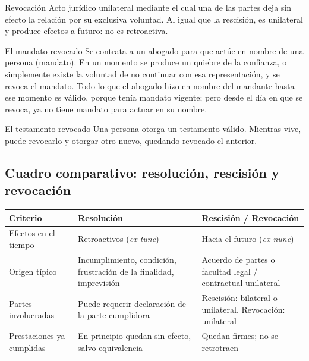 \documentclass[12pt,oneside]{book}
\begin{document}
\begin{definition}{Revocación}
Acto jurídico unilateral mediante el cual una de las partes deja sin efecto la relación por su exclusiva voluntad. Al igual que la rescisión, es unilateral y produce efectos a futuro: no es retroactiva.
\end{definition}

\begin{example}{El mandato revocado}
Se contrata a un abogado para que actúe en nombre de una persona (mandato). En un momento se produce un quiebre de la confianza, o simplemente existe la voluntad de no continuar con esa representación, y se revoca el mandato. Todo lo que el abogado hizo en nombre del mandante hasta ese momento es válido, porque tenía mandato vigente; pero desde el día en que se revoca, ya no tiene mandato para actuar en su nombre.
\end{example}

\begin{example}{El testamento revocado}
Una persona otorga un testamento válido. Mientras vive, puede revocarlo y otorgar otro nuevo, quedando revocado el anterior.
\end{example}

\subsection{Cuadro comparativo: resolución, rescisión y revocación}

\begin{table}[H]
\centering
\begin{tabularx}{\textwidth}{
    >{\raggedright\arraybackslash}p{3.0cm}
    >{\raggedright\arraybackslash}X
    >{\raggedright\arraybackslash}X
}
\toprule
\textbf{Criterio} & \textbf{Resolución} & \textbf{Rescisión / Revocación} \\
\midrule
Efectos en el tiempo & Retroactivos (\textit{ex tunc}) & Hacia el futuro (\textit{ex nunc}) \\
\addlinespace
Origen típico & Incumplimiento, condición, frustración de la finalidad, imprevisión & Acuerdo de partes o facultad legal / contractual unilateral \\
\addlinespace
Partes involucradas & Puede requerir declaración de la parte cumplidora & Rescisión: bilateral o unilateral. Revocación: unilateral \\
\addlinespace
Prestaciones ya cumplidas & En principio quedan sin efecto, salvo equivalencia & Quedan firmes; no se retrotraen \\
\bottomrule
\end{tabularx}
\end{table}
\end{document}

